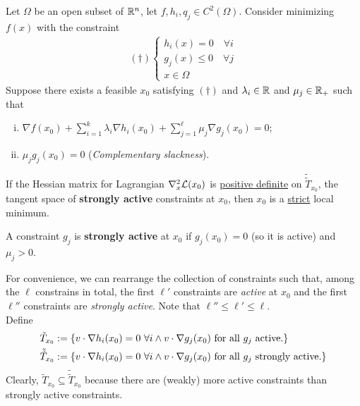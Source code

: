 \documentclass{article}
\newcommand{\ttilde}[1]{\tilde{\tilde{#1}}}
\begin{document}
	\begin{theorem}
		Let $\Omega$ be an open subset of $\mathbb{R}^n$, let $f, h_i, q_j \in C^2(\Omega)$. Consider minimizing $f(x)$ with the constraint
		\begin{align}
			(\dag ) \begin{cases}
				h_i(x) = 0\quad \forall i \\
				g_j(x) \leq 0\quad \forall j \\
				x \in \Omega
			\end{cases}
		\end{align}
		Suppose there exists a feasible $x_0$ satisfying $(\dag)$ and $\lambda_i \in \mathbb{R}$ and $\mu_j \in \mathbb{R}_{+}$ such that
   		\begin{enumerate}[(i)]
   			\item $\nabla f(x_0) + \sum_{i=1}^k \lambda_i \nabla h_i(x_0) + \sum_{j=1}^\ell \mu_j \nabla g_j(x_0) = 0$;
   			\item $\mu_j g_j(x_0) = 0$ (\emph{Complementary slackness}).
   		\end{enumerate}
   		If the Hessian matrix for Lagrangian $\nabla_x^2 \mathcal{{L}}(x_0)$ is \ul{positive definite} on $\ttilde{T}_{x_0}$, the tangent space of \textbf{strongly active} constraints at $x_0$, then $x_0$ is a \ul{strict} local minimum.
	\end{theorem}
	
	\begin{definition}
		A constraint $g_j$ is \textbf{strongly active} at $x_0$ if $g_j(x_0) = 0$ (so it is active) and $\mu_j > 0$. 
	\end{definition}
	
	\begin{notation}
		For convenience, we can rearrange the collection of constraints such that, among the $\ell$ constrains in total, the first $\ell'$ constraints are \emph{active} at $x_0$ and the first $\ell''$ constraints are \emph{strongly active}. Note that $\ell'' \leq \ell ' \leq \ell$. \\
		Define 
		\begin{align}
			\tilde{T}_{x_0} &:= \{
			v \cdot \nabla h_i(x_0) = 0\ \forall i \land v \cdot \nabla g_j(x_0)\tx{ for all $g_j$ active.}
			\} \\
			\ttilde{T}_{x_0} &:= \{
			v \cdot \nabla h_i(x_0) = 0\ \forall i \land v \cdot \nabla g_j(x_0) \tx{ for all $g_j$ strongly active.}
			\}
		\end{align}
		Clearly, $\tilde{T}_{x_0} \subseteq \ttilde{T}_{x_0}$ because there are (weakly) more active constraints than strongly active constraints.
	\end{notation}
	
\end{document}
